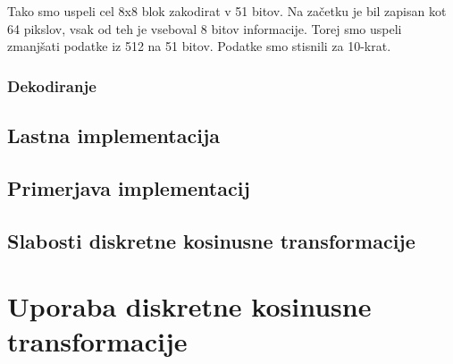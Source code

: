 \documentclass[a4paper,12pt,openright]{book}
\begin{document}
Tako smo uspeli cel 8x8 blok zakodirat v 51 bitov. Na začetku je bil zapisan kot 64 pikslov, vsak od teh je vseboval 8 bitov informacije. Torej smo uspeli zmanjšati podatke iz 512 na 51 bitov. Podatke smo stisnili za 10-krat.

\subsection{Dekodiranje}



\section{Lastna implementacija}

\section{Primerjava implementacij}

\section{Slabosti diskretne kosinusne transformacije}


\chapter{Uporaba diskretne kosinusne transformacije}
\label{ch1}
\end{document}
